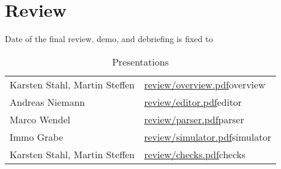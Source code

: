 
\section*{Review}

Date of the final review, demo, and debriefing is fixed to

\begin{center}
\end{center}



\begin{table}[htbp]
  \centering
  \begin{tabular}{ll}
    Karsten Stahl, Martin Steffen & \url{review/overview.pdf}{overview}
    \\
    Andreas Niemann & \url{review/editor.pdf}{editor}
    \\
    Marco Wendel & \url{review/parser.pdf}{parser}
    \\
    Immo Grabe & \url{review/simulator.pdf}{simulator}
    \\
    Karsten Stahl, Martin Steffen & \url{review/checks.pdf}{checks}
  \end{tabular}
  \caption{Presentations}
  \label{tab:presentations}
\end{table}



